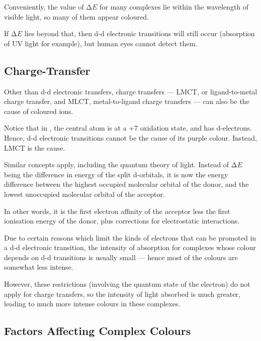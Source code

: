 				Conveniently, the value of $∆E$ for many complexes lie within the wavelength of visible light, so many of them appear
				coloured.

				If $∆E$ lies beyond that, then d-d electronic transitions will still occur (absorption of UV light for example),
				but human eyes cannot detect them.




		\pagebreak
		\subsection{Charge-Transfer}

			Other than d-d electronic transfers, charge transfers --- LMCT, or ligand-to-metal charge transfer, and MLCT, metal-to-ligand
			charge transfers --- can also be the cause of coloured ions.

			Notice that in , the central  atom is at a +7 oxidation state, and has  d-electrons. Hence, d-d electronic
			transitions cannot be the cause of its  purple colour. Instead, LMCT is the cause.

			Similar concepts apply, including the quantum theory of light. Instead of $∆E$ being the difference in energy of the split
			d-orbitals, it is now the energy difference between the highest occupied molecular orbital of the donor, and the lowest unoccupied
			molecular orbital of the acceptor.

			In other words, it is the first electron affinity of the acceptor less the first ionisation energy of the donor, plus corrections
			for electrostatic interactions.

			\mathdiagram{
				\[ ∆E = E_{A} - E_{I} + J \]
			}

			Due to certain reasons which limit the kinds of electrons that can be promoted in a d-d electronic transition, the intensity of
			absorption for complexes whose colour depends on d-d transitions is usually small --- hence most of the colours are somewhat
			less intense.

			However, these restrictions (involving the quantum state of the electron) do not apply for charge transfers, so the intensity
			of light absorbed is much greater, leading to much more intense colours in these complexes.



		\subsection{Factors Affecting Complex Colours}

